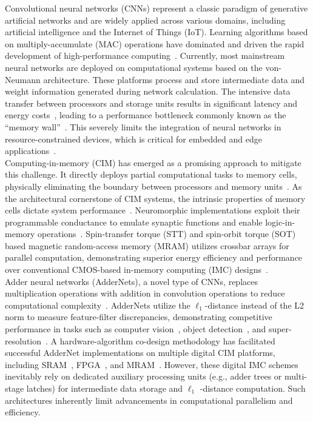 \documentclass[submit]{elex2024}%
\begin{document}
Convolutional neural networks (CNNs) represent a classic paradigm of generative artificial networks and are widely applied across various domains, including artificial intelligence and the Internet of Things (IoT). Learning algorithms based on multiply-accumulate (MAC) operations have dominated and driven the rapid development of high-performance computing~\cite{1,2,3}. Currently, most mainstream neural networks are deployed on computational systems based on the von-Neumann architecture. These platforms process and store intermediate data and weight information generated during network calculation. The intensive data transfer between processors and storage units results in significant latency and energy costs~\cite{4}, leading to a performance bottleneck commonly known as the “memory wall”~\cite{5}. This severely limits the integration of neural networks in resource-constrained devices, which is critical for embedded and edge applications~\cite{6,7}. \\
Computing-in-memory (CIM) has emerged as a promising approach to mitigate this challenge. It directly deploys partial computational tasks to memory cells, physically eliminating the boundary between processors and memory units~\cite{8,9}. As the architectural cornerstone of CIM systems, the intrinsic properties of memory cells dictate system performance~\cite{10}. Neuromorphic implementations exploit their programmable conductance to emulate synaptic functions and enable logic-in-memory operations~\cite{11}. Spin-transfer torque (STT) and spin-orbit torque (SOT) based magnetic random-access memory (MRAM) utilizes crossbar arrays for parallel computation, demonstrating superior energy efficiency and performance over conventional CMOS-based in-memory computing (IMC) designs~\cite{12,13,14,15,16}.\\
Adder neural networks (AdderNets), a novel type of CNNs, replaces multiplication operations with addition in convolution operations to reduce computational complexity~\cite{17}. AdderNets utilize the $\ell_1$-distance instead of the L2 norm to measure feature-filter discrepancies, demonstrating competitive performance in tasks such as computer vision~\cite{18}, object detection~\cite{19}, and super-resolution~\cite{20}. A hardware-algorithm co-design methodology has facilitated successful AdderNet implementations on multiple digital CIM platforms, including SRAM~\cite{21}, FPGA~\cite{22}, and MRAM~\cite{23}. However, these digital IMC schemes inevitably rely on dedicated auxiliary processing units (e.g., adder trees or multi-stage latches) for intermediate data storage and $\ell_1$ -distance computation. Such architectures inherently limit advancements in computational parallelism and efficiency. \\
\end{document}
